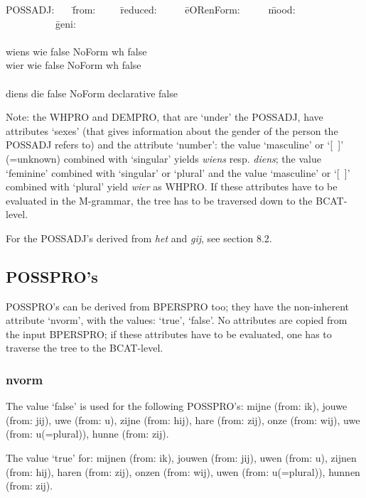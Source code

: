\begin{tabbing}
POSSADJ: \ \ \  \= from:\ \ \ \ \  \= reduced: \ \ \ \ \  \= eORenForm: 
\ \ \ \ \  \= mood:  \ \ \ \ \ \ \ \ \ \    \= geni: \\
         \>       \>          \>              \>              \>       \\
wiens   \> wie   \> false    \> NoForm   \> wh           \> false \\
wier    \> wie   \> false    \> NoForm   \> wh           \> false \\
        \>       \>          \>          \>              \>       \\
diens   \> die   \> false    \> NoForm   \> declarative  \> false \\
\end{tabbing}

Note: the WHPRO and DEMPRO, that are `under' the POSSADJ, have attributes
`sexes' (that gives information about the gender of the 
person the POSSADJ refers to) and the attribute `number': the value `masculine'
or `[\ ]' (=unknown) combined with `singular' yields {\em wiens} resp. 
{\em diens}; 
the value `feminine' combined with `singular' or `plural' and the value 
`masculine' or `[\ ]' combined with `plural' yield {\em wier} as 
WHPRO. If these 
attributes have to be evaluated in the M-grammar, the tree has to be traversed
down to the BCAT-level.

For the POSSADJ's derived from {\em het} and {\em gij}, see section 8.2.


\subsection{POSSPRO's}

POSSPRO's can be derived from BPERSPRO too; they have the
non-inherent attribute `nvorm', with the values: `true', `false'.
No attributes are copied from the input BPERSPRO; if these
attributes have to be evaluated, one has to traverse the tree to the 
BCAT-level.


\subsubsection{nvorm}

The value `false' is used for the following POSSPRO's: mijne (from: ik), 
jouwe (from: jij), uwe (from: u), zijne (from: hij), hare (from: zij), 
onze (from: wij), uwe (from: u(=plural)), hunne (from: zij).

The value `true' for: mijnen (from: ik), jouwen (from: jij), uwen (from: u), 
zijnen (from: hij), haren (from: zij), onzen (from: wij), 
uwen (from: u(=plural)), hunnen (from: zij).

